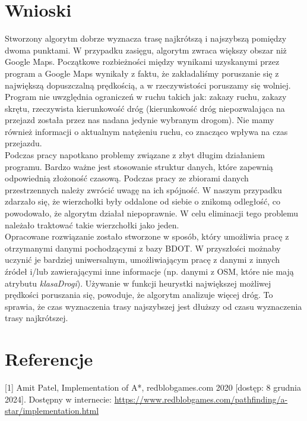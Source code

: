 \documentclass{article}
\begin{document}
\section{Wnioski}
Stworzony algorytm dobrze wyznacza trasę najkrótszą i najszybszą pomiędzy dwoma punktami. W przypadku zasięgu, algorytm zwraca większy obszar niż Google Maps.
Początkowe rozbieżności między wynikami uzyskanymi przez program a Google Maps wynikały z faktu, że zakładaliśmy poruszanie się z największą dopuszczalną prędkością, a w rzeczywistości poruszamy się wolniej.
Program nie uwzględnia ograniczeń w ruchu takich jak: zakazy ruchu, zakazy skrętu, rzeczywista kierunkowość dróg (kierunkowość dróg niepozwalająca na przejazd została przez 
nas nadana jedynie wybranym drogom). Nie mamy również informacji o aktualnym natężeniu ruchu, co znacząco wpływa na czas przejazdu.\\
Podczas pracy napotkano problemy związane z zbyt długim działaniem programu. Bardzo ważne jest stosowanie struktur danych, które zapewnią odpowiednią złożoność czasową. 
Podczas pracy ze zbiorami danych przestrzennych należy zwrócić uwagę na ich spójność. W naszym przypadku zdarzało się, że wierzchołki były oddalone od siebie o znikomą odległość, co powodowało, że algorytm działał niepoprawnie. W celu eliminacji tego problemu należało traktować takie wierzchołki jako jeden.\\
Opracowane rozwiązanie zostało stworzone w sposób, który umożliwia pracę z otrzymanymi danymi pochodzącymi z bazy BDOT. W przyszłości 
możnaby uczynić je bardziej uniwersalnym, umożliwiającym pracę z danymi z innych źródeł i/lub zawierającymi inne informacje (np. danymi z OSM,
które nie mają atrybutu \textit{klasaDrogi}). 
Używanie w funkcji heurystki największej możliwej prędkości poruszania się, powoduje, że algorytm analizuje więcej dróg. To sprawia, że czas wyznaczenia trasy najszybszej jest dłuższy od czasu wyznaczenia trasy najkrótszej.

\section{Referencje}
[1] Amit Patel, Implementation of A*, redblobgames.com 2020 [dostęp: 8 grudnia 2024]. Dostępny w internecie: \url{https://www.redblobgames.com/pathfinding/a-star/implementation.html}
\end{document}
